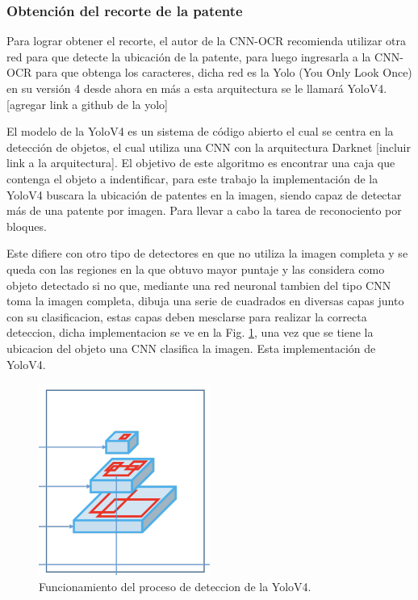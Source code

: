 \subsubsection*{Obtención del recorte de la patente}

Para lograr obtener el recorte, el autor de la CNN-OCR recomienda utilizar otra red para que detecte la ubicación de la patente, para luego ingresarla a la CNN-OCR para que obtenga los caracteres, dicha red es la Yolo (You Only Look Once) en su versión 4 desde ahora en más a esta arquitectura se le llamará YoloV4. [agregar link a github de la yolo]

El modelo de la YoloV4 es un sistema de código abierto el cual se centra en la detección de objetos, el cual utiliza una CNN con la arquitectura Darknet [incluir link a la arquitectura]. El objetivo de este algoritmo es encontrar una caja que contenga el objeto a indentificar, para este trabajo la implementación de la YoloV4 buscara la ubicación de patentes en la imagen, siendo capaz de detectar más de una patente por imagen. Para llevar a cabo la tarea de reconociento por bloques.

Este difiere con otro tipo de detectores en que no utiliza la imagen completa y se queda con las regiones en la que obtuvo mayor puntaje y las
considera como objeto detectado si no que, mediante una red neuronal tambien del tipo CNN toma la imagen completa, dibuja una serie de cuadrados
en diversas capas junto con su clasificacion, estas capas deben mesclarse para realizar la correcta deteccion, dicha implementacion se ve en la
Fig. \ref{fig:funcionamiento-yolo}, una vez que se tiene la ubicacion del objeto una CNN clasifica la imagen. Esta implementación de YoloV4.
\begin{figure}
    \centering
    \includegraphics[width=0.5\textwidth]{imgs/funcionamiento-yolo.png}
    \caption{Funcionamiento del proceso de deteccion de la YoloV4.}
    \label{fig:funcionamiento-yolo}
\end{figure}

